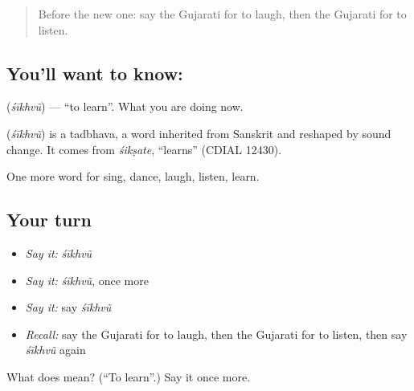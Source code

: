 \label{lesson:GU-C56-shikhvu}



\begin{quote}
Before the new one: say the Gujarati for to laugh, then the Gujarati for to listen.
\end{quote}

\subsection*{You'll want to know: }
\textbf{} (\emph{śīkhvũ}) — \textquotedblleft{}to learn\textquotedblright{}. What you are doing now.

\begin{cousinweb}
\textbf{} (\emph{śīkhvũ}) is a tadbhava, a word inherited from Sanskrit and reshaped by sound change. It comes from \emph{śikṣate}, \textquotedblleft{}learns\textquotedblright{} (CDIAL 12430).
\end{cousinweb}

\begin{grammarlens}[title={What you've built}]
One more word for sing, dance, laugh, listen, learn.
\end{grammarlens}

\subsection*{Your turn}
\begin{itemize}
\raggedright
  \item \emph{Say it:} \emph{śīkhvũ}
  \item \emph{Say it:} \emph{śīkhvũ}, once more
  \item \emph{Say it:} say \emph{śīkhvũ}
  \item \emph{Recall:} say the Gujarati for to laugh, then the Gujarati for to listen, then say \emph{śīkhvũ} again
\end{itemize}

\begin{tcolorbox}[breakable,colback=teal!4,colframe=teal!35!black,title={Before you move on}]
What does  mean? (\textquotedblleft{}To learn\textquotedblright{}.) Say it once more.
\end{tcolorbox}
